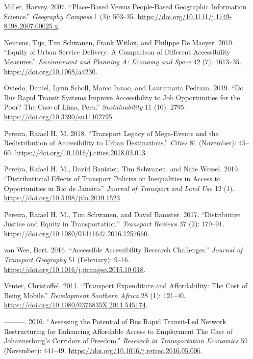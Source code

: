 \documentclass[msc,numbers]{coppe}
\begin{document}
\begin{CSLReferences}{1}{0}
  \leavevmode\hypertarget{ref-miller2007placebased}{}%
  Miller, Harvey. 2007. {``Place-{Based} Versus {People}-{Based Geographic Information Science}.''} \emph{Geography Compass} 1 (3): 503--35. \url{https://doi.org/10.1111/j.1749-8198.2007.00025.x}.

  \leavevmode\hypertarget{ref-neutens2010equity}{}%
  Neutens, Tijs, Tim Schwanen, Frank Witlox, and Philippe De Maeyer. 2010. {``Equity of {Urban Service Delivery}: {A Comparison} of {Different Accessibility Measures}.''} \emph{Environment and Planning A: Economy and Space} 42 (7): 1613--35. \url{https://doi.org/10.1068/a4230}.

  \leavevmode\hypertarget{ref-oviedo2019bus}{}%
  Oviedo, Daniel, Lynn Scholl, Marco Innao, and Lauramaria Pedraza. 2019. {``Do {Bus Rapid Transit Systems Improve Accessibility} to {Job Opportunities} for the {Poor}? {The Case} of {Lima}, {Peru}.''} \emph{Sustainability} 11 (10): 2795. \url{https://doi.org/10.3390/su11102795}.

  \leavevmode\hypertarget{ref-pereira2018transport}{}%
  Pereira, Rafael H. M. 2018. {``Transport Legacy of Mega-Events and the Redistribution of Accessibility to Urban Destinations.''} \emph{Cities} 81 (November): 45--60. \url{https://doi.org/10.1016/j.cities.2018.03.013}.

  \leavevmode\hypertarget{ref-pereira2019distributional}{}%
  Pereira, Rafael H. M., David Banister, Tim Schwanen, and Nate Wessel. 2019. {``Distributional Effects of Transport Policies on Inequalities in Access to Opportunities in {Rio} de {Janeiro}.''} \emph{Journal of Transport and Land Use} 12 (1). \url{https://doi.org/10.5198/jtlu.2019.1523}.

  \leavevmode\hypertarget{ref-pereira2017distributive}{}%
  Pereira, Rafael H. M., Tim Schwanen, and David Banister. 2017. {``Distributive Justice and Equity in Transportation.''} \emph{Transport Reviews} 37 (2): 170--91. \url{https://doi.org/10.1080/01441647.2016.1257660}.

  \leavevmode\hypertarget{ref-vanwee2016accessible}{}%
  van Wee, Bert. 2016. {``Accessible Accessibility Research Challenges.''} \emph{Journal of Transport Geography} 51 (February): 9--16. \url{https://doi.org/10.1016/j.jtrangeo.2015.10.018}.

  \leavevmode\hypertarget{ref-venter2011transport}{}%
  Venter, Christoffel. 2011. {``Transport Expenditure and Affordability: {The} Cost of Being Mobile.''} \emph{Development Southern Africa} 28 (1): 121--40. \url{https://doi.org/10.1080/0376835X.2011.545174}.

  \leavevmode\hypertarget{ref-venter2016assessing}{}%
  ---------. 2016. {``Assessing the Potential of Bus Rapid Transit-Led Network Restructuring for Enhancing Affordable Access to Employment {} {The} Case of {Johannesburg}'s {Corridors} of {Freedom}.''} \emph{Research in Transportation Economics} 59 (November): 441--49. \url{https://doi.org/10.1016/j.retrec.2016.05.006}.

  \end{CSLReferences}
\end{document}
